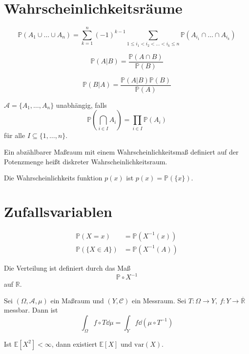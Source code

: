\documentclass[prb,12pt, twocolumn]{revtex4-2}
\theoremstyle{definition}
\theoremstyle{definition}
\theoremstyle{definition}
\newcommand{\R}{\mathbb{R}}
\begin{document}
\section{Wahrscheinlichkeitsräume}
\begin{Note}
\begin{widetext}
\[\mathbb{P}(A_1\cup \dots \cup A_n)=\sum_{k=1}^n (-1)^{k-1}\sum_{1\le i_1< i_2<\dots < i_k\le n}\mathbb{P}(A_{i_1}\cap \dots \cap A_{i_k})\]
\end{widetext}
\end{Note}
\begin{Note}
\[\mathbb{P}(A|B)=\frac{\mathbb{P}(A\cap B)}{\mathbb{P}(B)}\]
\end{Note}
\begin{Note}
\[\mathbb{P}(B|A)=\frac{\mathbb{P}(A|B)\mathbb{P}(B)}{\mathbb{P}(A)}\]
\end{Note}
\begin{Note} $\mathcal{A}=\{A_1, \dots, A_n\}$ unabhängig, falls
\[\mathbb{P}\left(\bigcap_{i\in I} A_i\right)=\prod_{i\in I}\mathbb{P}(A_i)\]
für alle $I\subseteq \{1,\dots, n\}$.	
\end{Note}
\begin{Note}[Diskret]
	Ein abzählbarer Maßraum mit einem Wahrscheinlichkeitsmaß definiert auf der Potenzmenge heißt diskreter Wahrscheinlichkeitsraum.
\end{Note}
\begin{Note}[Wahrscheinlichkeitsfunktion]
	Die Wahrscheinlichkeits funktion $p(x)$ ist $p(x) = \mathbb{P}(\{x\})$. 
\end{Note}
\section{Zufallsvariablen}
\begin{Note}
	\begin{align*}
		\mathbb{P}(X = x) &= \mathbb{P}(X^{-1}(x))\\
		\mathbb{P}(\{X\in A\})&=\mathbb{P}(X^{-1}(A))
	\end{align*}
\end{Note}
\begin{Note}[Verteilung]
	Die Verteilung ist definiert durch das Maß
	\[\mathbb{P}\circ X^{-1}\]
	auf $\R$.
\end{Note}
\begin{Note}[Transformationsformel]
	Sei $(\Omega, \mathcal{A}, \mu)$ ein Maßraum und $(Y, \mathcal{C})$ ein Messraum. Sei $T:\Omega\to Y,~f:Y\to \overline{\R}$ messbar. Dann ist
	\[\int_\Omega f\circ T\dd{\mu} = \int_Y f\dd{(\mu\circ T^{-1})}\]
\end{Note}
\begin{Note}
	Ist $\mathbb{E}[X^2]<\infty$, dann existiert $\mathbb{E}[X]$ und $\text{var}(X)$.
\end{Note}
\end{document}
